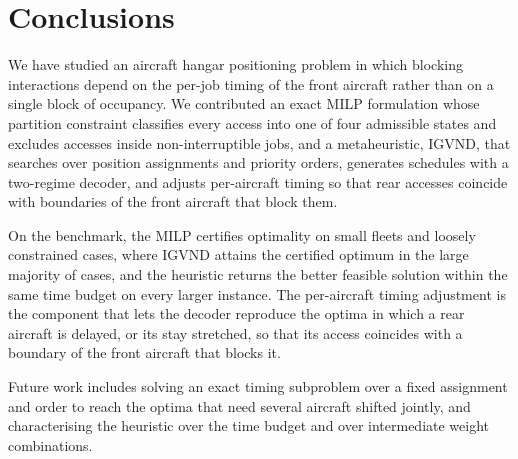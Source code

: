 \section{Conclusions}
\label{sec:conclusions}

We have studied an aircraft hangar positioning problem in which blocking
interactions depend on the per-job timing of the front aircraft rather than
on a single block of occupancy.  We contributed an exact MILP formulation
whose partition constraint classifies every access into one of four
admissible states and excludes accesses inside non-interruptible jobs,
and a metaheuristic, IGVND, that searches over position assignments and
priority orders, generates schedules with a two-regime decoder, and
adjusts per-aircraft timing so that rear accesses coincide with
boundaries of the front aircraft that block them.

On the benchmark, the MILP certifies optimality on small fleets and
loosely constrained cases, where IGVND attains the certified optimum in
the large majority of cases, and the heuristic returns the better
feasible solution within the same time budget on every larger instance.
The per-aircraft timing adjustment is the component that lets the
decoder reproduce the optima in which a rear aircraft is delayed, or its
stay stretched, so that its access coincides with a boundary of the
front aircraft that blocks it.

Future work includes solving an exact timing subproblem over a fixed
assignment and order to reach the optima that need several aircraft
shifted jointly, and characterising the heuristic over the time budget
and over intermediate weight combinations.
